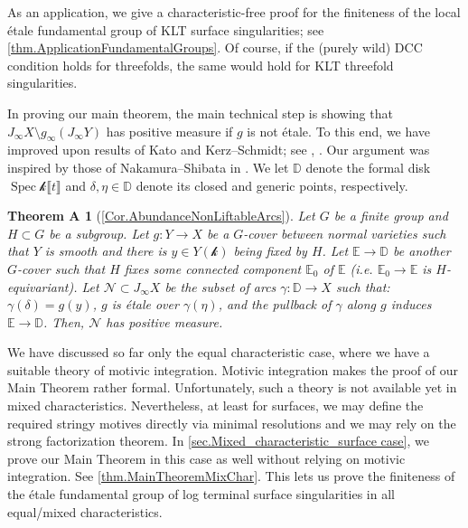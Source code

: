\documentclass[12pt]{amsart}
\theoremstyle{plain}   %
\newtheorem*{theoremA*}{Theorem A}
\theoremstyle{definition}    %
\theoremstyle{remark}    %
\numberwithin{equation}{theorem}
\DeclareMathOperator{\Spec}{{Spec}}
\newcommand{\kay}{\mathcal{k}}
\newcommand{\sN}{\mathcal{N}}
\newcommand{\bD}{\mathbb{D}}
\newcommand{\bE}{\mathbb{E}}
\begin{document}
As an application, we give a characteristic-free proof for the finiteness of the local \'etale fundamental group of KLT surface singularities; see \autoref{thm.ApplicationFundamentalGroups}. Of course, if the (purely wild) DCC condition holds for threefolds, the same would hold for KLT threefold singularities. 



In proving our main theorem, the main technical step is showing that $J_{\infty} X \setminus g_{\infty}(J_{\infty} Y)$ has positive measure if $g$ is not \'etale. To this end, we have improved upon results of Kato and Kerz--Schmidt; see \cite[Lemma 3.5]{KatoWildRamificationRestrictionCurves}, \cite[Lemma 2.4]{KerzSchmidtOnDifferentNotionsOfTameness}. Our argument was inspired by those of Nakamura--Shibata in \cite{NakamuraShibataInversionOdAdjunctionForQuotientSingularities}. We let $\bD$ denote the formal disk $\Spec \kay \llbracket t \rrbracket$ and $\delta , \eta \in \bD$ denote its closed and generic points, respectively.

\begin{theoremA*}[\autoref{Cor.AbundanceNonLiftableArcs}]
Let $G$ be a finite group and $H\subset G$ be a subgroup. Let $g\colon Y\to X$ be a $G$-cover between normal varieties such that $Y$ is smooth and there is $y \in Y(\kay)$ being fixed by $H$. Let  $\bE\to \bD$ be another $G$-cover such that $H$ fixes some connected component $\bE_0$ of $\bE$ (i.e. $\bE_0 \to \bE$ is $H$-equivariant). Let $\sN \subset J_{\infty} X$ be the subset of arcs $\gamma \colon \bD\to X$ such that: $\gamma(\delta) = g(y)$,  $g$ is \'etale over $\gamma(\eta)$, and the pullback of $\gamma$ along $g$ induces $\bE\to \bD$. Then, $\sN$ has positive measure. 
\end{theoremA*}


We have discussed so far only the equal characteristic case, where we have a suitable theory of motivic integration. Motivic integration makes the proof of our Main Theorem rather formal. Unfortunately, such a theory is not available yet in mixed characteristics. Nevertheless, at least for surfaces, we may define the required stringy motives directly via minimal resolutions and we may rely on the strong factorization theorem. In \autoref{sec.Mixed_characteristic_surface case}, we prove our Main Theorem in this case as well without relying on motivic integration. See \autoref{thm.MainTheoremMixChar}. This lets us prove the finiteness of the \'etale fundamental group of log terminal surface singularities in all equal/mixed characteristics.
\end{document}
